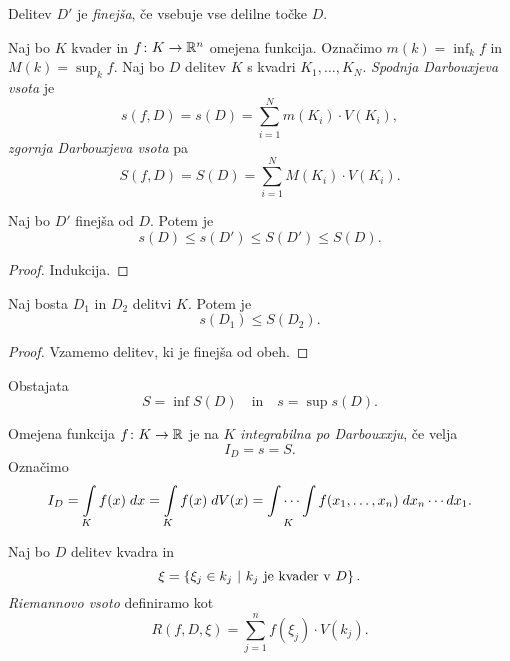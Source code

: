 \begin{definicija}
Delitev $D'$ je \emph{finejša}, če
vsebuje vse delilne točke $D$.
\end{definicija}

\begin{definicija}
Naj bo $K$ kvader in $f \colon K \to \mathbb{R}^n$ omejena funkcija.
Označimo
$\displaystyle m(k) = \inf_k f$ in $\displaystyle M(k) = \sup_k f$.
Naj bo $D$ delitev $K$ s kvadri $K_1,\dots,K_N$.
\emph{Spodnja Darbouxjeva vsota} je
\[
s(f,D) = s(D) = \sum_{i=1}^N m(K_i) \cdot V(K_i),
\]
\emph{zgornja Darbouxjeva vsota} pa
\[
S(f,D) = S(D) = \sum_{i=1}^N M(K_i) \cdot V(K_i).
\]
\end{definicija}

\begin{trditev}
Naj bo $D'$ finejša od $D$. Potem je
\[
s(D) \leq s(D') \leq S(D') \leq S(D).
\]
\end{trditev}

\begin{proof}
Indukcija.
\end{proof}

\begin{trditev}
Naj bosta $D_1$ in $D_2$ delitvi $K$. Potem je
\[
s(D_1) \leq S(D_2).
\]
\end{trditev}

\begin{proof}
Vzamemo delitev, ki je finejša od obeh.
\end{proof}

\begin{posledica}
Obstajata
\[
S = \inf S(D) \quad \text{in} \quad s = \sup s(D).
\]
\end{posledica}

\begin{definicija}
Omejena funkcija $f \colon K \to \mathbb{R}$ je na $K$
\emph{integrabilna po Darbouxxju}, če
velja
\[
I_D = s = S.
\]
Označimo
\[
I_D = \int\limits_K f(x)\;dx = \int\limits_K f(x)\;dV(x) =
\idotsint\limits_K f(x_1,\dots,x_n)\;dx_n\cdots dx_1.
\]
\end{definicija}

\begin{definicija}
Naj bo $D$ delitev kvadra in
\[
\xi = \left\{\xi_j \in k_j~\middle\vert~\text{$k_j$ je kvader v $D$}\right\}.
\]
\emph{Riemannovo vsoto} definiramo kot
\[
R(f,D,\xi) = \sum_{j=1}^n f(\xi_j) \cdot V(k_j).
\]
\end{definicija}

